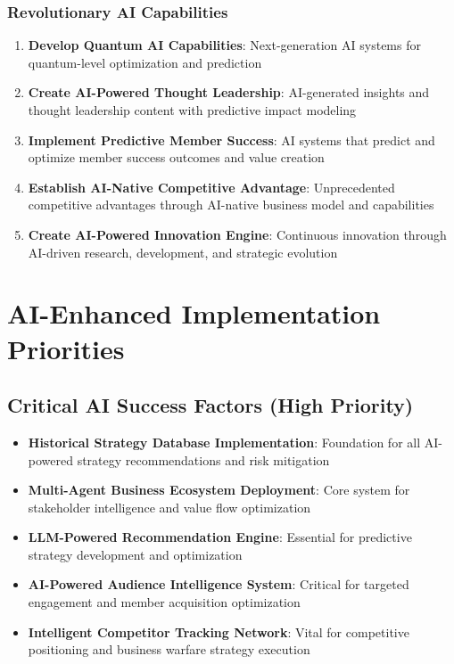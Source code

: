 \subsubsection{Revolutionary AI Capabilities}

\begin{enumerate}
    \item \textbf{Develop Quantum AI Capabilities}: Next-generation AI systems for quantum-level optimization and prediction
    \item \textbf{Create AI-Powered Thought Leadership}: AI-generated insights and thought leadership content with predictive impact modeling
    \item \textbf{Implement Predictive Member Success}: AI systems that predict and optimize member success outcomes and value creation
    \item \textbf{Establish AI-Native Competitive Advantage}: Unprecedented competitive advantages through AI-native business model and capabilities
    \item \textbf{Create AI-Powered Innovation Engine}: Continuous innovation through AI-driven research, development, and strategic evolution
\end{enumerate}

\section{AI-Enhanced Implementation Priorities}

\subsection{Critical AI Success Factors (High Priority)}

\begin{itemize}
    \item \textbf{Historical Strategy Database Implementation}: Foundation for all AI-powered strategy recommendations and risk mitigation
    \item \textbf{Multi-Agent Business Ecosystem Deployment}: Core system for stakeholder intelligence and value flow optimization
    \item \textbf{LLM-Powered Recommendation Engine}: Essential for predictive strategy development and optimization
    \item \textbf{AI-Powered Audience Intelligence System}: Critical for targeted engagement and member acquisition optimization
    \item \textbf{Intelligent Competitor Tracking Network}: Vital for competitive positioning and business warfare strategy execution
\end{itemize}


